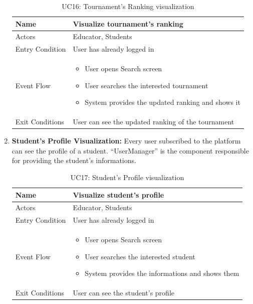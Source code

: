\begin{enumerate}
   \begin{table}[H]
       \centering
       \begin{tabular}{|l|m{11cm}|}
        \hline
            Name & Visualize tournament's ranking\\
        \hline
            Actors & Educator, Students\\
        \hline
            Entry Condition & User has already logged in\\
        \hline
            Event Flow & 
            \begin{itemize}
                \item User opens Search screen
                \item User searches the interested tournament
                \item System provides the updated ranking and shows it
            \end{itemize}\\
        \hline
            Exit Conditions & User can see the updated ranking of the tournament\\
        \hline
       \end{tabular}
       \caption{UC16: Tournament's Ranking visualization}
       \label{tab:uc16}
   \end{table}

   \newpage

       \item \textbf{Student's Profile Visualization:}
    Every user subscribed to the platform can see the profile of a student. “UserManager” is the component responsible for providing the student's informations.
    
   \begin{table}[H]
       \centering
       \begin{tabular}{|l|m{11cm}|}
        \hline
            Name & Visualize student's profile\\
        \hline
            Actors & Educator, Students\\
        \hline
            Entry Condition & User has already logged in\\
        \hline
            Event Flow & 
            \begin{itemize}
                \item User opens Search screen
                \item User searches the interested student
                \item System provides the informations and shows them
            \end{itemize}\\
        \hline
            Exit Conditions & User can see the student's profile\\
        \hline
       \end{tabular}
       \caption{UC17: Student's Profile visualization}
       \label{tab:uc17}
   \end{table}
   
\end{enumerate}

